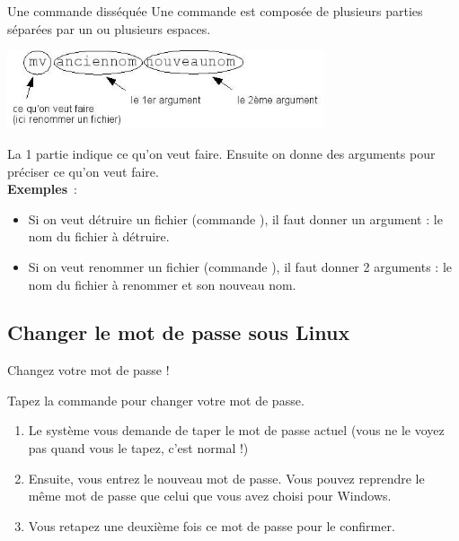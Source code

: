 \documentclass[a4paper,11pt]{style-esi/td}
\begin{document}
	\begin{theorie}{Une commande disséquée}
		Une commande est composée de plusieurs parties 
		séparées par un ou plusieurs espaces. 
		\begin{center}
			\includegraphics[width=0.7\textwidth]{images/commande.jpg}
		\end{center}
		La 1\iere{} partie indique ce qu'on veut faire. 
		Ensuite on donne des arguments pour préciser ce qu'on veut faire.
		\\
		\textbf{Exemples} :
		\begin{itemize}
		\item 
			Si on veut détruire un fichier (commande ), 
			il faut donner un argument : le nom du fichier à détruire.
		\item 
			Si on veut renommer un fichier (commande ), 
			il faut donner 2 arguments : 
			le nom du fichier à renommer et son nouveau nom.
		\end{itemize}
	\end{theorie}

	\subsection{Changer le mot de passe sous Linux}

		\begin{Tutoriel}{Changez votre mot de passe !}
			\vspace{-1em}
			\begin{steps}
			\item Tapez la commande  pour changer votre mot de passe.
			\end{steps}
			\begin{enumerate}				
				\item 
					Le système vous demande de taper le mot de passe actuel 
					(vous ne le voyez pas quand vous le tapez, c'est normal !)
				\item 
					Ensuite, vous entrez le nouveau mot de passe.
					Vous pouvez reprendre le même mot de passe 
					que celui que vous avez choisi pour Windows.
				\item 
					Vous retapez une deuxième fois ce mot de passe pour le confirmer.
			\end{enumerate}
		\end{Tutoriel}
				
\end{document}
